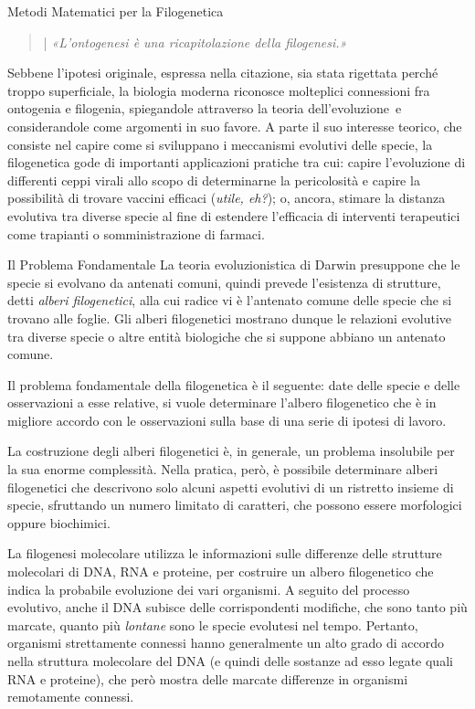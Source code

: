 \documentclass{article}
\begin{document}
	\begin{section}{Metodi Matematici per la Filogenetica}
		\begin{quote}
			| \textit{«L'ontogenesi è una ricapitolazione della filogenesi.»}
		\end{quote}
		Sebbene l'ipotesi originale, espressa nella citazione, sia stata rigettata perché troppo superficiale, la biologia moderna riconosce molteplici connessioni fra ontogenia e filogenia, spiegandole attraverso la teoria dell'evoluzione e considerandole come argomenti in suo favore.
		A parte il suo interesse teorico, che consiste nel capire come si sviluppano i meccanismi evolutivi delle specie, la filogenetica gode di importanti applicazioni pratiche tra cui: capire l’evoluzione di differenti ceppi virali allo scopo di determinarne la pericolosità e capire la possibilità di trovare vaccini efficaci (\emph{utile, eh?}); o, ancora, stimare la distanza evolutiva tra diverse specie al fine di estendere l’efficacia di interventi terapeutici come trapianti o somministrazione di farmaci.
		
		\begin{subsubsection}{Il Problema Fondamentale}
			La teoria evoluzionistica di Darwin presuppone che le specie si evolvano da antenati comuni, quindi prevede l’esistenza di strutture, detti \emph{alberi filogenetici}, alla cui radice vi è l’antenato comune delle specie che si trovano alle foglie. 
			Gli alberi filogenetici mostrano dunque le relazioni evolutive tra diverse specie o altre entità biologiche che si suppone abbiano un antenato comune. 
			
			Il problema fondamentale della filogenetica è il seguente: date delle specie e delle osservazioni a esse relative, si vuole determinare l’albero filogenetico che è in migliore accordo con le osservazioni sulla base di una serie di ipotesi di lavoro. 
			
			La costruzione degli alberi filogenetici è, in generale, un problema insolubile per la sua enorme complessità. Nella pratica, però, è possibile determinare alberi filogenetici che descrivono solo alcuni aspetti evolutivi di un ristretto insieme di specie, sfruttando un numero limitato di caratteri, che possono essere morfologici oppure biochimici.
			
			La filogenesi molecolare utilizza le informazioni sulle differenze delle strutture molecolari di DNA, RNA e proteine, per costruire un albero filogenetico che indica la probabile evoluzione dei vari organismi. 
			A seguito del processo evolutivo, anche il DNA subisce delle corrispondenti modifiche, che sono tanto più marcate, quanto più \emph{lontane} sono le specie evolutesi nel tempo. 
			Pertanto, organismi strettamente connessi hanno generalmente un alto grado di accordo nella struttura molecolare del DNA (e quindi delle sostanze ad esso legate quali RNA e proteine), che però mostra delle marcate differenze in organismi remotamente connessi.
		\end{subsubsection}
	

\end{section}
\end{document}
